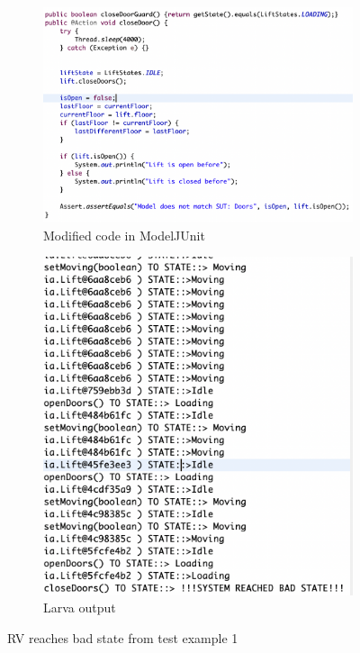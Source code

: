 \documentclass[a4paper, 12pt]{article}
\begin{document}
\begin{figure}[h]
\centering
\begin{subfigure}{.5\textwidth}
  \centering
  \includegraphics[width=\linewidth]{images/larva-test-fail-code}
  \caption{Modified code in ModelJUnit}
\end{subfigure}%
\begin{subfigure}{.5\textwidth}
  \centering
  \includegraphics[width=\linewidth]{images/larva-test-fail-output}
  \caption{Larva output}
\end{subfigure}
\caption{RV reaches bad state from test example 1}
\label{fig:larva-test-fail}
\end{figure}
\end{document}
